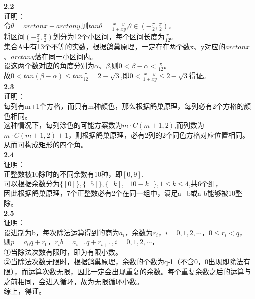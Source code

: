 \documentclass[a4paper,12pt]{article}
\begin{document}
	\noindent
	\textbf{2.2}\\
	证明：\\
	令$\theta=arctanx-arctany$,则$tan\theta=\frac{x-y}{1+xy}$,$\theta\in(-\frac{\pi}{2},\frac{\pi}{2})$。\\
	将区间$(-\frac{\pi}{2},\frac{\pi}{2})$划分为12个小区间，每个区间长度为$\frac{\pi}{12}$。\\
	集合A中有13个不等的实数，根据鸽巢原理，一定存在两个数x、y对应的$arctanx$、$arctany$落在同一小区间内。\\
	设这两个数对应的角度分别为$\alpha$、$\beta$,则$0<\beta-\alpha<\frac{\pi}{12}$。\\
	故$0<tan(\beta-\alpha)\leq tan\frac{\pi}{12}=2-\sqrt{3}$,即$0<\frac{x-y}{1+xy}\leq 2-\sqrt{3}$得证。\\
	
	\noindent
	\textbf{2.3}\\
	证明：\\
	每列有m+1个方格，而只有m种颜色，那么根据鸽巢原理，每列必有2个方格的颜色相同。\\
	这种情况下，每列涂色的可能方案数为$m\cdot C(m+1,2)$,而列数为$m\cdot C(m+1,2)+1$，则根据鸽巢原理，必有2列的2个同色方格对应位置相同。从而可构成矩形的四个角。\\
	
	\noindent
	\textbf{2.4}\\
	证明：\\
	正整数被10除时的不同余数有10种，即$[0,9]$,\\
	可以根据余数分为$\{[0]\},\{[5]\},\{[k],[10-k]\},1\leq k\leq 4$,共6个组，\\
	因此根据鸽巢原理，7个正整数必有2个在同一组中，满足a+b或a-b能够被10整除。\\
	
	\noindent
	\textbf{2.5}\\
	证明：\\
	设进制为b，每次除法运算得到的商为$a_{i}$，余数为$r_{i}$，$i=0,1,2,\cdots$，$0\leq r_{i}<q$，\\
	则$p=a_{0}q+r_{0}$，$r_{i}b=a_{i+1}q+r_{i+1},i=0,1,2,\cdots$，\\
	①当除法次数有限时，即为有限小数。\\
	②当除法次数无限时，根据鸽巢原理，余数的个数为q-1（不含0，0出现即除法有限），而运算次数无限，因此一定会出现重复的余数。每个重复余数之后的运算与之前相同，会进入循环，故为无限循环小数。\\
	综上，得证。\\
	

	
	
\end{document}
